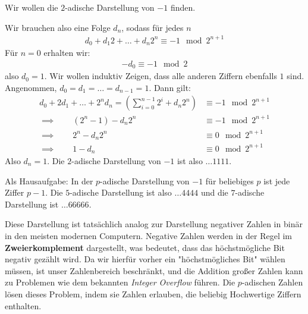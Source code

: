 \documentclass{report}
\newcommand*{\newpar}{\par\vspace{\baselineskip}\noindent}
\newcommand{\tbf}[1]{\textbf{#1}}
\begin{document}
	\begin{example}
		Wir wollen die $2$-adische Darstellung von $-1$ finden.
		\newpar
		Wir brauchen also eine Folge $d_n$, sodass für jedes $n$
		\begin{align*}
			d_0 + d_1 2 + \hdots + d_n 2^n \equiv -1 \mod 2^{n+1}
		\end{align*}
		Für $n = 0$ erhalten wir:
		\begin{align*}
			-d_0 \equiv -1 \mod 2
		\end{align*}
		also $d_0 = 1$. Wir wollen induktiv Zeigen, dass alle anderen Ziffern ebenfalls $1$ sind. Angenommen, $d_0 = d_1 = \hdots = d_{n-1} = 1$. Dann gilt:
		\begin{align*}
			d_0 + 2d_1 + \hdots + 2^nd_n  = \left(\sum_{i = 0}^{n-1} 2^i + d_n 2^n\right) 
			&\equiv -1 \mod 2^{n+1}\\
			\implies \qquad (2^n - 1) - d_n 2^n &\equiv -1 \mod 2^{n+1}\\
			\implies \qquad 2^n - d_n 2^n  &\equiv 0 \mod 2^{n+1}\\
			\implies \qquad 1 - d_n &\equiv 0 \mod 2^{n+1}
		\end{align*}
		Also $d_n = 1$. Die $2$-adische Darstellung von $-1$ ist also $\hdots1111$.
	\end{example}
	\begin{proposition}
		Als Hausaufgabe: In der $p$-adische Darstellung von $-1$ für beliebiges $p$ ist jede Ziffer $p-1$. Die $5$-adische Darstellung ist also $\hdots4444$ und die $7$-adische Darstellung ist $\hdots66666$.
	\end{proposition}
	\noindent Diese Darstellung ist tatsächlich analog zur Darstellung negativer Zahlen in binär in den meisten modernen Computern. Negative Zahlen werden in der Regel im \tbf{Zweierkomplement} dargestellt, was bedeutet, dass das höchstmögliche Bit negativ gezählt wird. Da wir hierfür vorher ein "höchstmögliches Bit" wählen müssen, ist unser Zahlenbereich beschränkt, und die Addition großer Zahlen kann zu Problemen wie dem bekannten \textit{Integer Overflow} führen. Die $p$-adischen Zahlen lösen dieses Problem, indem sie Zahlen erlauben, die beliebig Hochwertige Ziffern enthalten.
\end{document}
